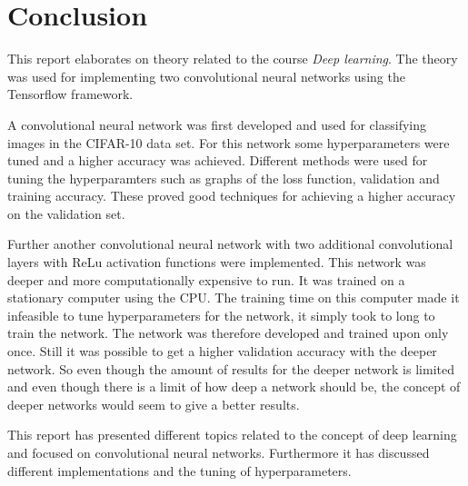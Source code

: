 \chapter{Conclusion}
\label{chp:conc}

This report elaborates on theory related to the course \emph{Deep learning}. The theory was used for implementing two convolutional neural networks using the Tensorflow framework.

A  convolutional neural network was first developed and used for classifying images in the CIFAR-10 data set. For this network some hyperparameters were tuned and a higher accuracy was achieved. Different methods were used for tuning the hyperparamters such as graphs of the loss function, validation and training accuracy. These proved good techniques for achieving a higher accuracy on the validation set.

Further another convolutional neural network with two additional convolutional layers with ReLu activation functions were implemented. This network was deeper and more computationally expensive to run. It was trained on a stationary computer using the CPU. The training time on this computer made it infeasible to tune hyperparameters for the network, it simply took to long to train the network. The network was therefore developed and trained upon only once. Still it was possible to get a higher validation accuracy with the deeper network. So even though the amount of results for the deeper network is limited and even though there is a limit of how deep a network should be, the concept of deeper networks would seem to give a better results.

This report has presented different topics related to the concept of deep learning and focused on convolutional neural networks. Furthermore it has discussed different implementations and the tuning of hyperparameters. 